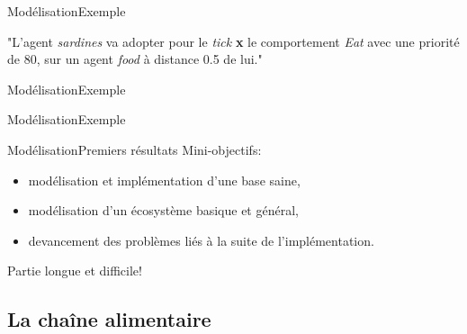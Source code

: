 \documentclass[t, 10pt]{beamer}
\begin{document}
	\begin{frame}[c]{Modélisation}{Exemple}
		\begin{figure}[htbp]
		\makebox[\textwidth]{\hrulefill}{
		\small
		
		\normalsize}
		\end{figure}
		\pause
		"L'agent \textit{sardines} va adopter pour le \textit{tick} \textbf{x} le comportement \textit{Eat} avec une priorité de 80, sur un agent \textit{food} à distance 0.5 de lui."
	\end{frame}
	
	\begin{frame}{Modélisation}{Exemple}
		\begin{figure}[htbp]
		\makebox[\textwidth]{\hrulefill}{
		\small
		
		\normalsize}
		\end{figure}
	\end{frame}
	
	\begin{frame}{Modélisation}{Exemple}
		\begin{figure}[htbp]
		\makebox[\textwidth]{\hrulefill}{
		\small
		
		\normalsize}
		\end{figure}
	\end{frame}
	
	\begin{frame}[c]{Modélisation}{Premiers résultats}
		Mini-objectifs:
		\begin{itemize}
			\item{modélisation et implémentation d'une base saine,}
			\item{modélisation d'un écosystème basique et général,}
			\item{devancement des problèmes liés à la suite de l'implémentation.}
		\end{itemize}
		\vfill
		\pause
		Partie longue et difficile!
	\end{frame}
	
	\subsection{La chaîne alimentaire}
        
\end{document}
